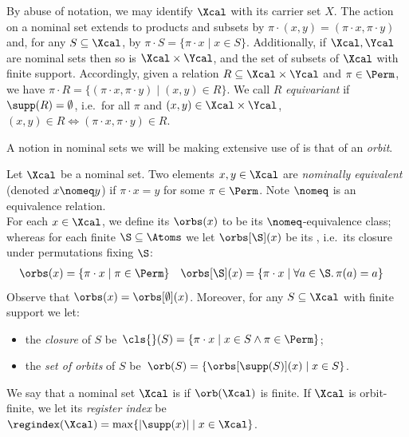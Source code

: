 By abuse of notation, we may identify $\Xcal$ with its carrier set $X$. 
The action on a nominal set extends to products and subsets by $\pi \cdot(x,y) = (\pi \cdot x, \pi \cdot y)$ and, for any $S \subseteq \Xcal$, by $\pi \cdot S = \{\pi \cdot x \mid x \in S\}$. 
Additionally, if $\Xcal, \Ycal$ are nominal sets then so is $\Xcal \times \Ycal$, and the set of subsets of $\Xcal$ with finite support.
Accordingly, given a relation $R\subseteq\Xcal\times\Ycal$ and $\pi\in\Perm$, we have $\pi\cdot R=\{(\pi\cdot x,\pi\cdot y)\mid (x,y)\in R\}$. We call $R$ \emph{equivariant} if $\supp(R)=\emptyset$, i.e.\ for all $\pi$ and $(x,y)\in\Xcal\times\Ycal$, $(x,y)\in R\iff (\pi\cdot x,\pi\cdot y)\in R$. 

A notion in nominal sets we will be making extensive use of is that of an \emph{orbit}.

\begin{definition}
    Let $\Xcal$ be a nominal set. 
    Two elements $x, y\in \Xcal$ are \emph{nominally equivalent} (denoted $x \nomeq y$) if $\pi \cdot x = y$ for some $\pi\in\Perm$. Note $\nomeq$ is an equivalence relation.
    \\
For each $x \in \Xcal$, we define its  $\orbs(x)$ to be its $\nomeq$-equivalence class; whereas for each finite $\S\subseteq\Atoms$ we let $\orbs[\S](x)$ be its , i.e.\ its closure under permutations fixing $\S$:
    \begin{align*}
        \orbs(x) &= \{\pi \cdot x \mid \pi \in \Perm\} &
    \orbs[\S](x) &= \{\pi \cdot x \mid \forall a\in\S.\,\pi(a)=a\}
    \end{align*}
    Observe that $\orbs(x)=\orbs[\emptyset](x)$.
    Moreover, for any $S\subseteq \Xcal$ with finite support we let:
    \begin{itemize}
    \item
the {\em closure} of $S$ be\
        $\cls{}(S) = \{\pi\cdot x\mid x\in S\land\pi\in\Perm\}$;
      \item the \emph{set of orbits} of $S$ be\
   $
        \orb(S) = \{ \orbs[\supp(S)](x) \mid x \in S\}
    $.
      \end{itemize}
We say that a nominal set $\Xcal$ is  if $\orb(\Xcal)$ is finite.
If $\Xcal$ is orbit-finite, we let its \emph{register index} be\
    $
        \regindex(\Xcal) = \max\{|\supp(x)| \mid x \in \Xcal\}
        $.
\end{definition}

